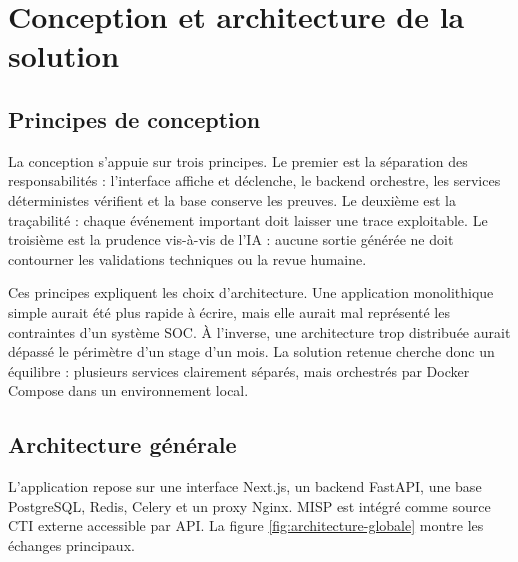 \chapter{Conception et architecture de la solution}

\section{Principes de conception}

La conception s'appuie sur trois principes. Le premier est la séparation des responsabilités : l'interface affiche et déclenche, le backend orchestre, les services déterministes vérifient et la base conserve les preuves. Le deuxième est la traçabilité : chaque événement important doit laisser une trace exploitable. Le troisième est la prudence vis-à-vis de l'IA : aucune sortie générée ne doit contourner les validations techniques ou la revue humaine.

Ces principes expliquent les choix d'architecture. Une application monolithique simple aurait été plus rapide à écrire, mais elle aurait mal représenté les contraintes d'un système SOC. À l'inverse, une architecture trop distribuée aurait dépassé le périmètre d'un stage d'un mois. La solution retenue cherche donc un équilibre : plusieurs services clairement séparés, mais orchestrés par Docker Compose dans un environnement local.

\section{Architecture générale}

L'application repose sur une interface Next.js, un backend FastAPI, une base PostgreSQL, Redis, Celery et un proxy Nginx. MISP est intégré comme source CTI externe accessible par API. La figure \ref{fig:architecture-globale} montre les échanges principaux.

